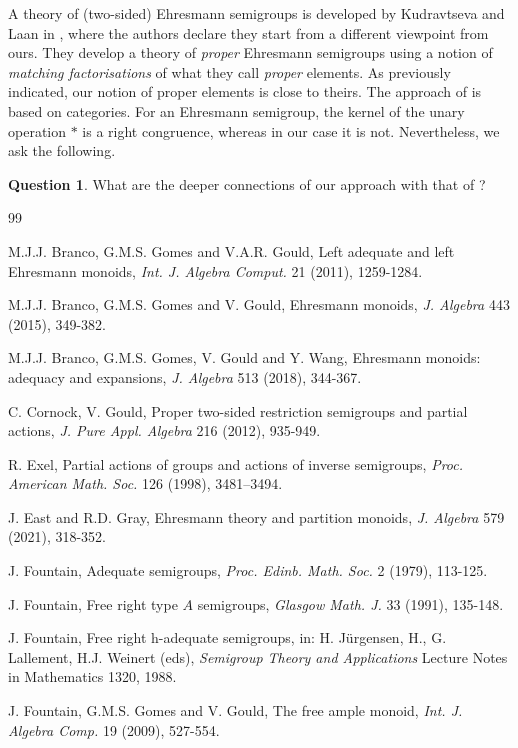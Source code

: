 \documentclass[12pt]{amsart}
\theoremstyle{definition}
\newtheorem{question}[them]{Question}
\theoremstyle{definition}
\numberwithin{them}{section}
\numberwithin{equation}{section}
\begin{document}
{{A theory of (two-sided) Ehresmann semigroups is developed by Kudravtseva and Laan in \cite{KL}, where the authors declare they start from a different viewpoint from ours. 
 They develop a theory of {\em proper} Ehresmann semigroups using a notion of {\em matching factorisations} of what they call {\em proper} elements. As previously indicated, our notion of proper elements is close to theirs.  The  approach of \cite{KL} is based on categories. For an Ehresmann semigroup, the kernel of the unary operation $*$ is a right congruence, whereas in our case it is not. Nevertheless, we ask the following.


\begin{question}\label{qn:2sided} What are the deeper connections of our approach with that of \cite{KL}? 
\end{question}


\begin{thebibliography}{99}

 M.J.J.  Branco, G.M.S. Gomes and V.A.R. Gould, Left adequate and left Ehresmann monoids, {\it Int. J. Algebra Comput.} 21 (2011), 1259-1284.

 M.J.J.  Branco, G.M.S. Gomes and V. Gould, Ehresmann monoids, {\it J. Algebra} 443 (2015), 349-382.

 M.J.J.  Branco, G.M.S. Gomes, V. Gould and Y. Wang, Ehresmann monoids: adequacy and expansions, {\it J. Algebra} 513 (2018), 344-367.

 C. Cornock, V. Gould, Proper two-sided restriction semigroups and partial actions, {\it J. Pure Appl. Algebra} 216 (2012), 935-949.


 R. Exel, Partial actions of groups and actions of inverse semigroups, {\em Proc. American
Math. Soc.}  126 (1998), 3481--3494.

 J. East and R.D. Gray, Ehresmann theory and partition monoids, {\it J. Algebra} 579 (2021), 318-352.

 J. Fountain, Adequate semigroups, {\it Proc. Edinb. Math. Soc.} 2 (1979), 113-125.


 J. Fountain, Free right type $A$ semigroups, {\it Glasgow Math. J.} 33 (1991), 135-148.

 J. Fountain, Free right h-adequate semigroups,  in: H. J\"{u}rgensen, H., G. Lallement,  H.J. Weinert (eds), {\em Semigroup Theory and Applications} Lecture Notes in Mathematics  1320, 1988.

 J. Fountain, G.M.S. Gomes and V. Gould, The free ample monoid, {\it Int. J. Algebra Comp.} 19 (2009), 527-554.



\end{thebibliography}}}
\end{document}
